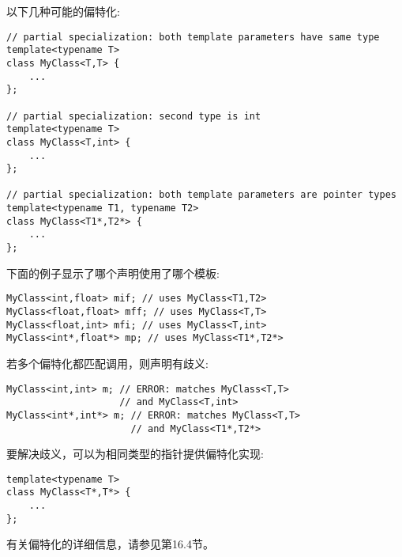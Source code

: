 以下几种可能的偏特化:

\begin{lstlisting}[style=styleCXX]
// partial specialization: both template parameters have same type
template<typename T>
class MyClass<T,T> {
	...
};

// partial specialization: second type is int
template<typename T>
class MyClass<T,int> {
	...
};

// partial specialization: both template parameters are pointer types
template<typename T1, typename T2>
class MyClass<T1*,T2*> {
	...
};
\end{lstlisting}

下面的例子显示了哪个声明使用了哪个模板:

\begin{lstlisting}[style=styleCXX]
MyClass<int,float> mif; // uses MyClass<T1,T2>
MyClass<float,float> mff; // uses MyClass<T,T>
MyClass<float,int> mfi; // uses MyClass<T,int>
MyClass<int*,float*> mp; // uses MyClass<T1*,T2*>
\end{lstlisting}

若多个偏特化都匹配调用，则声明有歧义:

\begin{lstlisting}[style=styleCXX]
MyClass<int,int> m; // ERROR: matches MyClass<T,T>
					// and MyClass<T,int>
MyClass<int*,int*> m; // ERROR: matches MyClass<T,T>
					  // and MyClass<T1*,T2*>
\end{lstlisting}

要解决歧义，可以为相同类型的指针提供偏特化实现:

\begin{lstlisting}[style=styleCXX]
template<typename T>
class MyClass<T*,T*> {
	...
};
\end{lstlisting}

有关偏特化的详细信息，请参见第16.4节。






